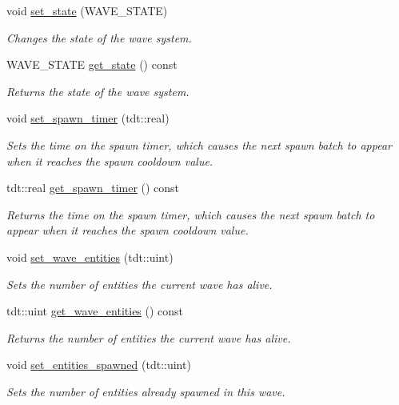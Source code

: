 \begin{DoxyCompactItemize}
void \hyperlink{class_wave_system_a3431e72c157cc75d1ad720b2992fe563}{set\+\_\+state} (W\+A\+V\+E\+\_\+\+S\+T\+A\+TE)
\begin{DoxyCompactList}\small\item\em Changes the state of the wave system. \end{DoxyCompactList}\item 
W\+A\+V\+E\+\_\+\+S\+T\+A\+TE \hyperlink{class_wave_system_a82da4bcf0e5afd20c2ae984234b4679d}{get\+\_\+state} () const 
\begin{DoxyCompactList}\small\item\em Returns the state of the wave system. \end{DoxyCompactList}\item 
void \hyperlink{class_wave_system_a3980c6abc389500169aa32932e300e46}{set\+\_\+spawn\+\_\+timer} (tdt\+::real)
\begin{DoxyCompactList}\small\item\em Sets the time on the spawn timer, which causes the next spawn batch to appear when it reaches the spawn cooldown value. \end{DoxyCompactList}\item 
tdt\+::real \hyperlink{class_wave_system_a70f7ec41e60ce75caffd2fd98e627d28}{get\+\_\+spawn\+\_\+timer} () const 
\begin{DoxyCompactList}\small\item\em Returns the time on the spawn timer, which causes the next spawn batch to appear when it reaches the spawn cooldown value. \end{DoxyCompactList}\item 
void \hyperlink{class_wave_system_ac359a846058fb5f45e34eca64438dfc9}{set\+\_\+wave\+\_\+entities} (tdt\+::uint)
\begin{DoxyCompactList}\small\item\em Sets the number of entities the current wave has alive. \end{DoxyCompactList}\item 
tdt\+::uint \hyperlink{class_wave_system_a6e446d9424066896680103a7c2a22c06}{get\+\_\+wave\+\_\+entities} () const 
\begin{DoxyCompactList}\small\item\em Returns the number of entities the current wave has alive. \end{DoxyCompactList}\item 
void \hyperlink{class_wave_system_a54052c43df7a6e7be869b705c27641c7}{set\+\_\+entities\+\_\+spawned} (tdt\+::uint)
\begin{DoxyCompactList}\small\item\em Sets the number of entities already spawned in this wave. \end{DoxyCompactList}\item 

\end{DoxyCompactItemize}

